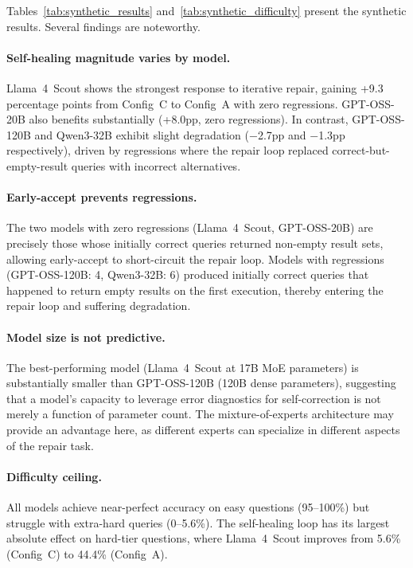 \documentclass{article}
\begin{document}
Tables~\ref{tab:synthetic_results} and~\ref{tab:synthetic_difficulty} present the synthetic results. Several findings are noteworthy.

\paragraph{Self-healing magnitude varies by model.} Llama~4~Scout shows the strongest response to iterative repair, gaining +9.3 percentage points from Config~C to Config~A with zero regressions. GPT-OSS-20B also benefits substantially (+8.0pp, zero regressions). In contrast, GPT-OSS-120B and Qwen3-32B exhibit slight degradation ($-$2.7pp and $-$1.3pp respectively), driven by regressions where the repair loop replaced correct-but-empty-result queries with incorrect alternatives.

\paragraph{Early-accept prevents regressions.} The two models with zero regressions (Llama~4~Scout, GPT-OSS-20B) are precisely those whose initially correct queries returned non-empty result sets, allowing early-accept to short-circuit the repair loop. Models with regressions (GPT-OSS-120B: 4, Qwen3-32B: 6) produced initially correct queries that happened to return empty results on the first execution, thereby entering the repair loop and suffering degradation.

\paragraph{Model size is not predictive.} The best-performing model (Llama~4~Scout at 17B MoE parameters) is substantially smaller than GPT-OSS-120B (120B dense parameters), suggesting that a model's capacity to leverage error diagnostics for self-correction is not merely a function of parameter count. The mixture-of-experts architecture may provide an advantage here, as different experts can specialize in different aspects of the repair task.

\paragraph{Difficulty ceiling.} All models achieve near-perfect accuracy on easy questions (95--100\%) but struggle with extra-hard queries (0--5.6\%). The self-healing loop has its largest absolute effect on hard-tier questions, where Llama~4~Scout improves from 5.6\% (Config~C) to 44.4\% (Config~A).
\end{document}
